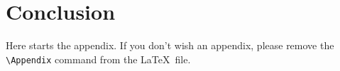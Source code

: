 \documentclass[twoside]{aiml20}
\begin{document}

\section{Conclusion}


\Appendix
Here starts the appendix. If you don't wish an appendix, please remove the \verb|\Appendix| command from the \LaTeX\ file.




\end{document}
